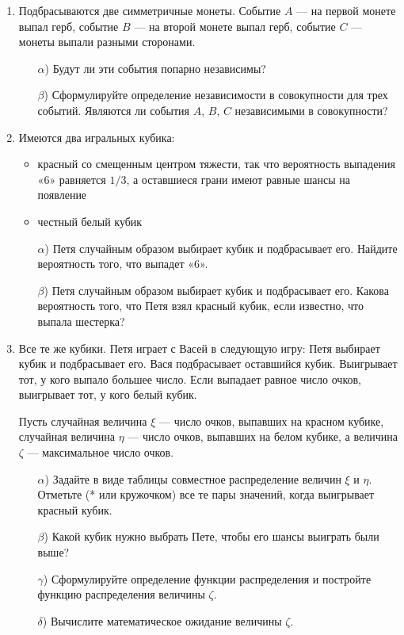 \begin{enumerate}
\item
Подбрасываются две симметричные монеты. Событие $A$ — на первой монете выпал
герб, событие $B$ — на второй монете выпал герб, событие $C$ — монеты выпали
разными сторонами.
\begin{enumerate}
    \item[$\alpha$)] Будут ли эти события попарно независимы?
    \item[$\beta$)]  Сформулируйте определение независимости в совокупности для трех событий. 
    Являются ли события $A$, $B$, $C$ независимыми в совокупности?
\end{enumerate}

\item
Имеются два игральных кубика:
\begin{itemize}
    \item красный со смещенным центром тяжести, так что вероятность выпадения «6»
    равняется $1/3$, а оставшиеся грани имеют равные шансы на появление
    \item честный белый кубик
\end{itemize}

\begin{enumerate}
    \item[$\alpha$)] Петя случайным образом выбирает кубик и подбрасывает его.
    Найдите вероятность того, что выпадет «6».
    \item[$\beta$)]   Петя случайным образом выбирает кубик и подбрасывает его.
    Какова вероятность того, что Петя взял красный кубик, если известно, что выпала
    шестерка?
\end{enumerate}

\item
Все те же кубики. Петя играет с Васей в следующую игру: Петя выбирает кубик и
подбрасывает его. Вася подбрасывает оставшийся кубик. Выигрывает тот, у кого
выпало большее число. Если выпадает равное число очков, выигрывает тот, у кого
белый кубик.

Пусть случайная величина $\xi$ — число очков, выпавших на красном кубике,
случайная величина $\eta$ — число очков,
выпавших на белом кубике, а величина $\zeta$ — максимальное число очков.

\begin{enumerate}
    \item[$\alpha$)] Задайте в виде таблицы совместное распределение величин $\xi$ и $\eta$.
    Отметьте (* или кружочком) все те пары значений, когда выигрывает красный кубик.
    \item[$\beta$)] Какой кубик нужно выбрать Пете, чтобы его шансы выиграть были выше?
    \item[$\gamma$)] Сформулируйте определение функции распределения и постройте функцию
    распределения величины $\zeta$.
    \item[$\delta$)] Вычислите математическое ожидание величины $\zeta$.
\end{enumerate}


\end{enumerate}

